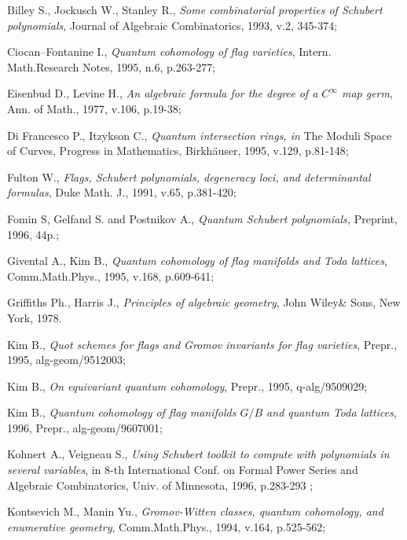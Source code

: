 {{\begin{thebibliography}{999}
        \bibitem [BJS]{[BJS]}
        Billey S., Jockusch W., Stanley R., {\it Some combinatorial properties 
        of Schubert polynomials}, Journal of Algebraic Combinatorics, 1993, 
        v.2, 345-374; 
        
	\bibitem [C]{[C]}
	Ciocan--Fontanine I., {\it Quantum cohomology of flag varieties},
        Intern. Math.Research Notes, 1995, n.6, p.263-277;
        
	\bibitem [EL]{[EL]}
	Eisenbud D., Levine H., {\it An algebraic formula for the degree
        of a $C^{\infty}$ map germ}, Ann. of Math., 1977, v.106, p.19-38;
        
	\bibitem [Fl]{[FI]}
	Di Francesco P., Itzykson C., {\it Quantum intersection rings, 
        in} The Moduli Space of Curves, Progress in Mathematics, 
        Birkh\"auser, 1995, v.129, p.81-148; 
        
        \bibitem [F]{[F]}
        Fulton W., {\it Flags, Schubert polynomials, degeneracy loci, and 
        determinantal formulas}, Duke Math. J., 1991, v.65, p.381-420;

        \bibitem [FGP]{[FGP]}
        Fomin S, Gelfand S. and Postnikov A., {\it Quantum Schubert
        polynomials,} Preprint, 1996, 44p.;
        
	\bibitem [GK]{[GK]}	
        Givental A., Kim B., {\it Quantum cohomology of flag manifolds and 
        Toda lattices}, Comm.Math.Phys., 1995, v.168, p.609-641;
        
        \bibitem [GH]{[GH]}
        Griffiths Ph., Harris J., {\it Principles of algebraic geometry}, 
        John Wiley\& Sons, New York, 1978.
        
	\bibitem [K1]{[K1]}
	Kim B., {\it Quot schemes for flags and Gromov invariants for flag 
	varieties}, Prepr., 1995, alg-geom/9512003;
	
	\bibitem [K2]{[K2]}
	Kim B., {\it On equivariant quantum cohomology}, Prepr., 1995, 
	\hbox{q-alg/9509029;}
	
	\bibitem [K3]{[K3]}
	Kim B., {\it Quantum cohomology of flag manifolds $G/B$ and quantum 
        Toda lattices}, 1996, Prepr., alg-geom/9607001;
        
        \bibitem [KV]{[KV]}
        Kohnert A., Veigneau S., {\it Using Schubert toolkit to compute with 
        polynomials in several variables}, in 8-th International Conf. on 
        Formal Power Series and Algebraic Combinatorics, Univ. of Minnesota, 
        1996, p.283-293 ;
        
	\bibitem [KM]{[KM]}
	Kontsevich M., Manin Yu., {\it Gromov-Witten classes, quantum 
        cohomology, and enumerative geometry}, Comm.Math.Phys., 1994,
        v.164, p.525-562;


\end{thebibliography}}}
